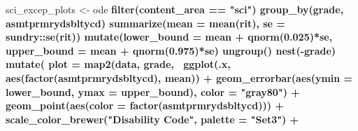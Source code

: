 \documentclass[]{article}
\newenvironment{Shaded}{\begin{snugshade}}{\end{snugshade}}
\newcommand{\DataTypeTok}[1]{\textcolor[rgb]{0.13,0.29,0.53}{#1}}
\newcommand{\FloatTok}[1]{\textcolor[rgb]{0.00,0.00,0.81}{#1}}
\newcommand{\KeywordTok}[1]{\textcolor[rgb]{0.13,0.29,0.53}{\textbf{#1}}}
\newcommand{\NormalTok}[1]{#1}
\newcommand{\OperatorTok}[1]{\textcolor[rgb]{0.81,0.36,0.00}{\textbf{#1}}}
\newcommand{\StringTok}[1]{\textcolor[rgb]{0.31,0.60,0.02}{#1}}
\begin{document}
\FloatBarrier

\begin{Shaded}
\end{Shaded}

\FloatBarrier

\begin{Shaded}
\begin{Highlighting}[]
\NormalTok{sci_excep_plots <-}\StringTok{ }\NormalTok{ode }\OperatorTok{%
\StringTok{  }\KeywordTok{filter}\NormalTok{(content_area }\OperatorTok{==}\StringTok{ "sci"}\NormalTok{) }\OperatorTok{%
\StringTok{  }\KeywordTok{group_by}\NormalTok{(grade, asmtprmrydsbltycd) }\OperatorTok{%
\StringTok{  }\KeywordTok{summarize}\NormalTok{(}\DataTypeTok{mean =} \KeywordTok{mean}\NormalTok{(rit),}
            \DataTypeTok{se   =}\NormalTok{ sundry}\OperatorTok{::}\KeywordTok{se}\NormalTok{(rit)) }\OperatorTok{%
\StringTok{  }\KeywordTok{mutate}\NormalTok{(}\DataTypeTok{lower_bound =}\NormalTok{ mean }\OperatorTok{+}\StringTok{ }\KeywordTok{qnorm}\NormalTok{(}\FloatTok{0.025}\NormalTok{)}\OperatorTok{*}\NormalTok{se,}
         \DataTypeTok{upper_bound =}\NormalTok{ mean }\OperatorTok{+}\StringTok{ }\KeywordTok{qnorm}\NormalTok{(}\FloatTok{0.975}\NormalTok{)}\OperatorTok{*}\NormalTok{se) }\OperatorTok{%
\StringTok{  }\KeywordTok{ungroup}\NormalTok{() }\OperatorTok{%
\StringTok{  }\KeywordTok{nest}\NormalTok{(}\OperatorTok{-}\NormalTok{grade) }\OperatorTok{%
\StringTok{  }\KeywordTok{mutate}\NormalTok{(}
    \DataTypeTok{plot =} \KeywordTok{map2}\NormalTok{(data, grade,}
      \OperatorTok{~}\KeywordTok{ggplot}\NormalTok{(.x, }\KeywordTok{aes}\NormalTok{(}\KeywordTok{factor}\NormalTok{(asmtprmrydsbltycd), mean)) }\OperatorTok{+}
\StringTok{        }\KeywordTok{geom_errorbar}\NormalTok{(}\KeywordTok{aes}\NormalTok{(}\DataTypeTok{ymin =}\NormalTok{ lower_bound, }
                          \DataTypeTok{ymax =}\NormalTok{ upper_bound),}
                      \DataTypeTok{color =} \StringTok{"gray80"}\NormalTok{) }\OperatorTok{+}
\StringTok{        }\KeywordTok{geom_point}\NormalTok{(}\KeywordTok{aes}\NormalTok{(}\DataTypeTok{color =} \KeywordTok{factor}\NormalTok{(asmtprmrydsbltycd))) }\OperatorTok{+}
\StringTok{        }\KeywordTok{scale_color_brewer}\NormalTok{(}\StringTok{"Disability Code"}\NormalTok{, }\DataTypeTok{palette =} \StringTok{"Set3"}\NormalTok{) }\OperatorTok{+}
}}}}}}}
\end{Highlighting}
\end{Shaded}
\end{document}
